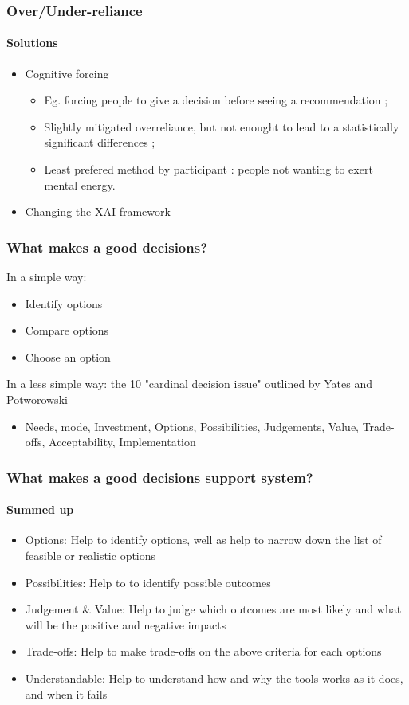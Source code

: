 \documentclass[compress,12pt]{beamer}
\begin{document}
\begin{frame}
      \frametitle{Over/Under-reliance}
      \framesubtitle{Solutions}
      \begin{itemize}
            \item Cognitive forcing \begin{itemize}
                  \item Eg. forcing people to give a decision before seeing a recommendation ;
                  \item Slightly mitigated overreliance, but not enought to lead to a statistically significant differences ;
                  \item Least prefered method by participant : people not wanting to exert mental energy.
            \end{itemize}
            \item Changing the XAI framework %
      \end{itemize}
\end{frame}

\begin{frame}
      \frametitle{What makes a good decisions?}
      In a simple way: \begin{itemize}
            \item Identify options
            \item Compare options
            \item Choose an option
      \end{itemize}
      In a less simple way: the 10 "cardinal decision issue" outlined by Yates and Potworowski \begin{itemize}
            \item Needs, mode, Investment, Options, Possibilities, Judgements, Value, Trade-offs, Acceptability, Implementation
      \end{itemize}
\end{frame}

\begin{frame}
      \frametitle{What makes a good decisions support system?}
      \framesubtitle{Summed up}
      \begin{itemize}
            \item Options: Help to identify options, well as help to narrow down the list of feasible or realistic options
            \item Possibilities: Help to to identify possible outcomes 
            \item Judgement \& Value: Help to judge which outcomes are most likely and what will be the positive and negative impacts
            \item Trade-offs: Help to make trade-offs on the above criteria for each options
            \item Understandable: Help to understand how and why the tools works as it does, and when it fails
      \end{itemize}
\end{frame}
\end{document}
